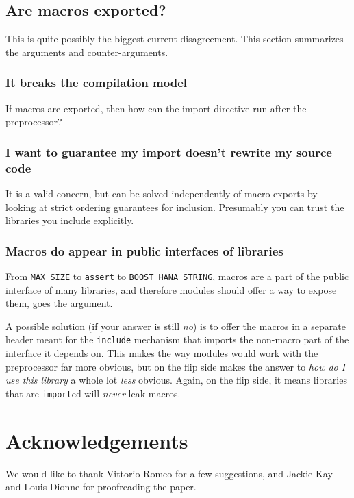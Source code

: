 \documentclass[reqno]{article}
\begin{document}
\subsection{Are macros exported?}

This is quite possibly the biggest current disagreement. This section summarizes
the arguments and counter-arguments.


\subsubsection{It breaks the compilation model}

If macros are exported, then how can the import directive run after the
preprocessor?

\subsubsection{I want to guarantee my import doesn't rewrite my source code}

It is a valid concern, but can be solved independently of macro exports by
looking at strict ordering guarantees for inclusion. Presumably you can trust
the libraries you include explicitly.

\subsubsection{Macros do appear in public interfaces of libraries}

From \texttt{MAX\_SIZE} to \texttt{assert} to \texttt{BOOST\_HANA\_STRING},
macros are a part of the public interface of many libraries, and therefore
modules should offer a way to expose them, goes the argument.

A possible solution (if your answer is still \emph{no}) is to offer the macros
in a separate header meant for the \texttt{include} mechanism that imports the
non-macro part of the interface it depends on. This makes the way modules would
work with the preprocessor far more obvious, but on the flip side makes the
answer to \emph{how do I use this library} a whole lot \emph{less} obvious.
Again, on the flip side, it means libraries that are \texttt{import}ed will
\emph{never} leak macros.

\section{Acknowledgements}
We would like to thank Vittorio Romeo for a few suggestions, and Jackie Kay and
Louis Dionne for proofreading the paper.


% 
\end{document}
